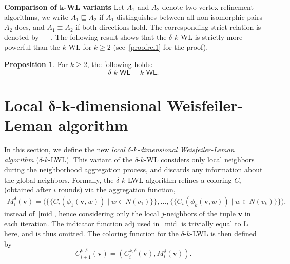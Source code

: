 \documentclass{article}
\newcommand{\xhdr}[1]{{\noindent\bfseries #1}}
\theoremstyle{definition}
\newtheorem{proposition}[theorem]{Proposition}
\newcommand{\new}[1]{\emph{#1}}
\renewcommand{\vec}[1]{\mathbf{#1}}
\newcommand{\kwl}{$k$-\textsf{WL}\xspace}
\newcommand{\deltakwl}{$\delta$-$k$-\textsf{WL}\xspace}
\newcommand{\kwlm}{k\textrm{-}\textsf{WL}\xspace}
\newcommand{\deltakwlm}{\delta\textrm{-}k\textrm{-}\textsf{WL}\xspace}
\newcommand{\localkwl}{$\delta$-$k$-\textsf{LWL}\xspace}
\begin{document}
\xhdr{Comparison of $\boldsymbol{k}$-\textsf{WL} variants} Let $A_1$ and $A_2$ denote two vertex refinement algorithms, we write $A_1 \sqsubseteq A_2$ if $A_1$ distinguishes between all non-isomorphic pairs $A_2$ does, and $A_1 \equiv A_2$ if both directions hold. The corresponding strict relation is denoted by $\sqsubset$. The following result shows that the \deltakwl is strictly more powerful than the \kwl for $k \geq 2$ (see~\cref{proofrel1} for the proof).  
\begin{proposition}\label{rel1} 
For $k \geq 2 $, the following holds: 	
\begin{equation*}
\deltakwlm \sqsubset \kwlm.
\end{equation*}
\end{proposition}
\section{Local $\boldsymbol{\delta}$-$\boldsymbol{k}$-dimensional Weisfeiler-Leman algorithm}\label{lwl}

In this section, we define the new \new{local $\delta$-$k$-dimensional Weisfeiler-Leman algorithm} (\localkwl). This variant of the \deltakwl considers only local neighbors during the neighborhood aggregation process, and discards any information about the global neighbors. Formally, the \localkwl algorithm refines a coloring $C_i$ (obtained after $i$ rounds) via the aggregation function, 
\begin{equation}\label{eqnmidd}
\begin{split}
M^{\delta}_i(\vec{v}) =   \big( \{\!\! \{ C_{i}(\phi_1(\vec{v},w)) \mid w \in N(v_1) \} \!\!\}, \dots, \{\!\! \{  C_{i}(\phi_k(\vec{v},w)) \mid w \in N(v_k) \}  \!\!\} \big),
\end{split}
\end{equation}		
instead of~\cref{mid}, hence considering only the local $j$-neighbors of the tuple $\vec{v}$ in each iteration. The indicator function $\mathrm{adj}$ used in~\cref{mid} is trivially equal to $\textsc{L}$ here, and is thus omitted. The coloring function for the \localkwl is then defined by
\begin{equation*}\label{ck}
C^{k,\delta}_{i+1}(\vec{v}) = (C^{k,\delta}_{i}(\vec{v}), M^{\delta}_i(\vec{v})).
\end{equation*} 
\end{document}
